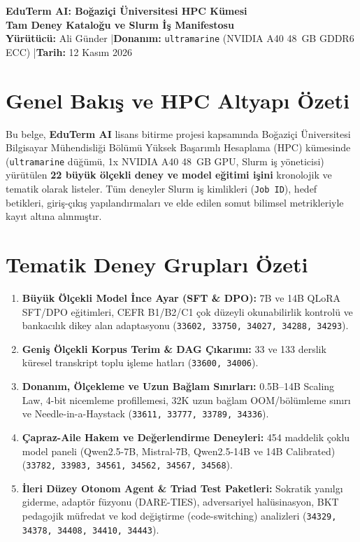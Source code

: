 \documentclass[10pt,a4paper]{article}
\begin{document}
\begin{center}
    {\LARGE\bfseries\color{bounnavy} EduTerm AI: Boğaziçi Üniversitesi HPC Kümesi}\\[0.2cm]
    {\Large\bfseries Tam Deney Kataloğu ve Slurm İş Manifestosu}\\[0.2cm]
    {\normalsize\textbf{Yürütücü:} Ali Günder \quad|\quad \textbf{Donanım:} \texttt{ultramarine} (NVIDIA A40 48~GB GDDR6 ECC) \quad|\quad \textbf{Tarih:} 12 Kasım 2026}
\end{center}

\vspace{0.3cm}

\section{Genel Bakış ve HPC Altyapı Özeti}
Bu belge, \textbf{EduTerm AI} lisans bitirme projesi kapsamında Boğaziçi Üniversitesi Bilgisayar Mühendisliği Bölümü Yüksek Başarımlı Hesaplama (HPC) kümesinde (\texttt{ultramarine} düğümü, 1x NVIDIA A40 48~GB GPU, Slurm iş yöneticisi) yürütülen \textbf{22 büyük ölçekli deney ve model eğitimi işini} kronolojik ve tematik olarak listeler. Tüm deneyler Slurm iş kimlikleri (\texttt{Job ID}), hedef betikleri, giriş-çıkış yapılandırmaları ve elde edilen somut bilimsel metrikleriyle kayıt altına alınmıştır.

\vspace{0.2cm}

\section{Tematik Deney Grupları Özeti}
\begin{enumerate}
    \item \textbf{Büyük Ölçekli Model İnce Ayar (SFT \& DPO):} 7B ve 14B QLoRA SFT/DPO eğitimleri, CEFR B1/B2/C1 çok düzeyli okunabilirlik kontrolü ve bankacılık dikey alan adaptasyonu (\texttt{33602, 33750, 34027, 34288, 34293}).
    \item \textbf{Geniş Ölçekli Korpus Terim \& DAG Çıkarımı:} 33 ve 133 derslik küresel transkript toplu işleme hatları (\texttt{33600, 34006}).
    \item \textbf{Donanım, Ölçekleme ve Uzun Bağlam Sınırları:} 0.5B--14B Scaling Law, 4-bit nicemleme profillemesi, 32K uzun bağlam OOM/bölümleme sınırı ve Needle-in-a-Haystack (\texttt{33611, 33777, 33789, 34336}).
    \item \textbf{Çapraz-Aile Hakem ve Değerlendirme Deneyleri:} 454 maddelik çoklu model paneli (Qwen2.5-7B, Mistral-7B, Qwen2.5-14B ve 14B Calibrated) (\texttt{33782, 33983, 34561, 34562, 34567, 34568}).
    \item \textbf{İleri Düzey Otonom Agent \& Triad Test Paketleri:} Sokratik yanılgı giderme, adaptör füzyonu (DARE-TIES), adversariyel halüsinasyon, BKT pedagojik müfredat ve kod değiştirme (code-switching) analizleri (\texttt{34329, 34378, 34408, 34410, 34443}).
\end{enumerate}
\end{document}
